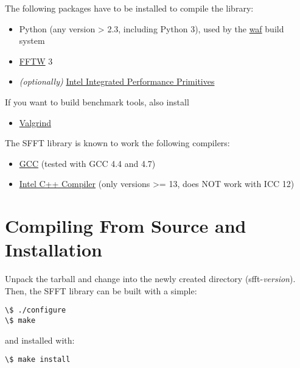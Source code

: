 \documentclass[letterpaper,10pt,english]{sphinxmanual}
\begin{document}
The following packages have to be installed to compile the library:
\begin{itemize}
\item {} 
Python (any version \textgreater{} 2.3, including Python 3), used by the \href{https://code.google.com/p/waf/}{waf} build
system

\item {} 
\href{http://www.fftw.org/}{FFTW} 3

\item {} 
\emph{(optionally)} \href{http://software.intel.com/intel-ipp}{Intel Integrated Performance Primitives}

\end{itemize}

If you want to build benchmark tools, also install
\begin{itemize}
\item {} 
\href{http://valgrind.org/}{Valgrind}

\end{itemize}

The SFFT library is known to work the following compilers:
\begin{itemize}
\item {} 
\href{http://gcc.gnu.org/}{GCC} (tested with GCC 4.4 and 4.7)

\item {} 
\href{http://software.intel.com/en-us/intel-compilers}{Intel C++ Compiler}  (only versions \textgreater{}= 13, does NOT work with ICC 12)

\end{itemize}


\section{Compiling From Source and Installation}
\label{installation:intel-c-compiler}\label{installation:compiling-from-source-and-installation}
Unpack the tarball and change into the newly created directory
(sfft-\emph{version}). Then, the SFFT library can be built with a simple:

\begin{Verbatim}[commandchars=\\\{\}]
\$ ./configure
\$ make
\end{Verbatim}

and installed with:

\begin{Verbatim}[commandchars=\\\{\}]
\$ make install
\end{Verbatim}
\end{document}
